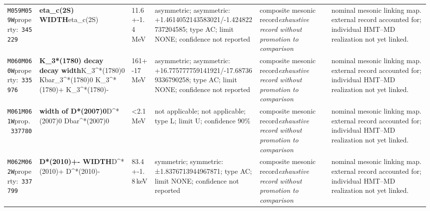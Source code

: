 \begin{landscape}
\begin{longtable}{L{1.85cm}L{4.45cm}L{2.35cm}L{4.05cm}L{3.35cm}L{7.15cm}}
\texttt{M059}\newline \texttt{M059W}\newline property:\ \texttt{345229} & \textbf{eta\_\allowbreak{}c(2S) WIDTH}\newline eta\_\allowbreak{}c(2S) & 11.6+-1.4\,MeV & asymmetric; asymmetric: +1.4614052143583021/-1.424822737204585; type AC; limit NONE; confidence not reported & composite mesonic record\newline \emph{exhaustive record without promotion to comparison} & nominal mesonic linking map. external record accounted for; individual HMT--MD realization not yet linked. \\
\texttt{M060}\newline \texttt{M060W}\newline property:\ \texttt{335976} & \textbf{K\_\allowbreak{}3*(1780) decay decay width}\newline K\_\allowbreak{}3\textasciicircum{}*(1780)0 \textbar{}\allowbreak{} Kbar\_\allowbreak{}3\textasciicircum{}*(1780)0 \textbar{}\allowbreak{} K\_\allowbreak{}3\textasciicircum{}*(1780)+ \textbar{}\allowbreak{} K\_\allowbreak{}3\textasciicircum{}*(1780)- & 161+-17\,MeV & asymmetric; asymmetric: +16.775777759141921/-17.687369336790258; type AC; limit NONE; confidence not reported & composite mesonic record\newline \emph{exhaustive record without promotion to comparison} & nominal mesonic linking map. external record accounted for; individual HMT--MD realization not yet linked. \\
\texttt{M061}\newline \texttt{M061W}\newline prop.\ \texttt{337780} & \textbf{width of D*(2007)0}\newline D\textasciicircum{}*(2007)0 \textbar{}\allowbreak{} Dbar\textasciicircum{}*(2007)0 & \textless{}2.1\,MeV & not applicable; not applicable; type L; limit U; confidence 90\% & composite mesonic record\newline \emph{exhaustive record without promotion to comparison} & nominal mesonic linking map. external record accounted for; individual HMT--MD realization not yet linked. \\
\texttt{M062}\newline \texttt{M062W}\newline property:\ \texttt{337799} & \textbf{D*(2010)+- WIDTH}\newline D\textasciicircum{}*(2010)+ \textbar{}\allowbreak{} D\textasciicircum{}*(2010)- & 83.4+-1.8\,keV & symmetric; symmetric: ±1.8376713944967871; type AC; limit NONE; confidence not reported & composite mesonic record\newline \emph{exhaustive record without promotion to comparison} & nominal mesonic linking map. external record accounted for; individual HMT--MD realization not yet linked. \\

\end{longtable}
\end{landscape}
